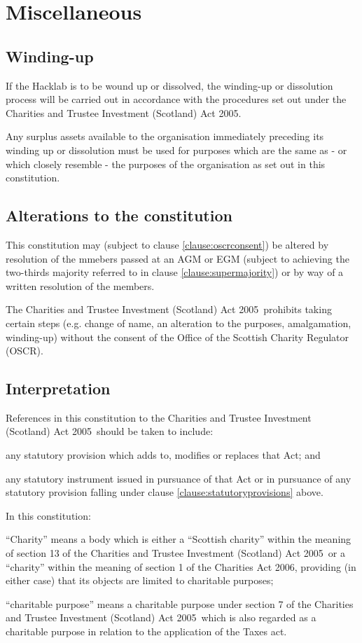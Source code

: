 \documentclass{article}
\newcommand{\charityact}{Charities and Trustee Investment (Scotland) Act 2005}
\begin{document}
\section{Miscellaneous}

\subsection{Winding-up}

\clause  If the Hacklab is to be wound up or dissolved, the winding-up
or dissolution process will be carried out in accordance with the
procedures set out under the \charityact.

\clause Any surplus assets available to the organisation immediately
preceding its winding up or dissolution must be used for purposes
which are the same as - or which closely resemble - the purposes of
the organisation as set out in this constitution.

\subsection{Alterations to the constitution}

\clause This constitution may (subject to clause
\ref{clause:oscrconsent}) be altered by resolution of the mmebers
passed at an AGM or EGM (subject to achieving the two-thirds majority
referred to in clause \ref{clause:supermajority}) or by way of a
written resolution of the members.

\clause\label{clause:oscrconsent}The \charityact\ prohibits taking
certain steps (e.g. change of name, an alteration to the purposes,
amalgamation, winding-up) without the consent of the Office of the
Scottish Charity Regulator (OSCR).

\subsection{Interpretation}

\clause References in this constitution to the \charityact\ should be
taken to include:

\subclause any statutory provision which adds to, modifies or replaces
that Act; and

\subclause any statutory instrument issued in pursuance of that Act or
in pursuance of any statutory provision falling under clause
\ref{clause:statutoryprovisions} above.

\clause In this constitution:

\subclause ``Charity'' means a body which is either a ``Scottish
charity'' within the meaning of section 13 of the \charityact\ or a
``charity'' within the meaning of section 1 of the Charities Act 2006,
providing (in either case) that its objects are limited to charitable
purposes; 

\subclause ``charitable purpose'' means a charitable purpose under
section 7 of the \charityact\ which is also regarded as a charitable
purpose in relation to the application of the Taxes act.
\end{document}
